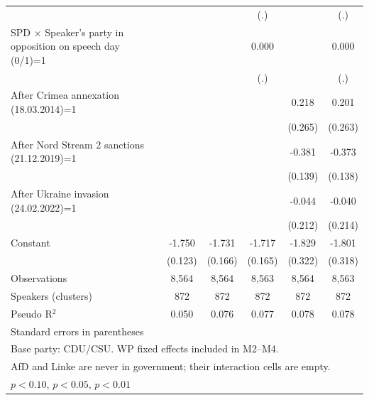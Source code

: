 \begin{table}[htbp]
\begin{tabular}{l*{5}{c}}
                    &                     &                     &         (.)         &                     &         (.)         \\
\addlinespace
SPD $\times$ Speaker's party in opposition on speech day (0/1)=1&                     &                     &       0.000         &                     &       0.000         \\
                    &                     &                     &         (.)         &                     &         (.)         \\
\addlinespace
After Crimea annexation (18.03.2014)=1&                     &                     &                     &       0.218         &       0.201         \\
                    &                     &                     &                     &     (0.265)         &     (0.263)         \\
\addlinespace
After Nord Stream 2 sanctions (21.12.2019)=1&                     &                     &                     &      -0.381\sym{***}&      -0.373\sym{***}\\
                    &                     &                     &                     &     (0.139)         &     (0.138)         \\
\addlinespace
After Ukraine invasion (24.02.2022)=1&                     &                     &                     &      -0.044         &      -0.040         \\
                    &                     &                     &                     &     (0.212)         &     (0.214)         \\
\addlinespace
Constant            &      -1.750\sym{***}&      -1.731\sym{***}&      -1.717\sym{***}&      -1.829\sym{***}&      -1.801\sym{***}\\
                    &     (0.123)         &     (0.166)         &     (0.165)         &     (0.322)         &     (0.318)         \\
\midrule
Observations        &       8,564         &       8,564         &       8,563         &       8,564         &       8,563         \\
Speakers (clusters) &         872         &         872         &         872         &         872         &         872         \\
Pseudo R$^2$        &       0.050         &       0.076         &       0.077         &       0.078         &       0.078         \\
\bottomrule
\multicolumn{6}{l}{\footnotesize Standard errors in parentheses}\\
\multicolumn{6}{l}{\footnotesize Base party: CDU/CSU. WP fixed effects included in M2--M4.}\\
\multicolumn{6}{l}{\footnotesize AfD and Linke are never in government; their interaction cells are empty.}\\
\multicolumn{6}{l}{\footnotesize \sym{*} \(p<0.10\), \sym{**} \(p<0.05\), \sym{***} \(p<0.01\)}\\
\end{tabular}
\end{table}
